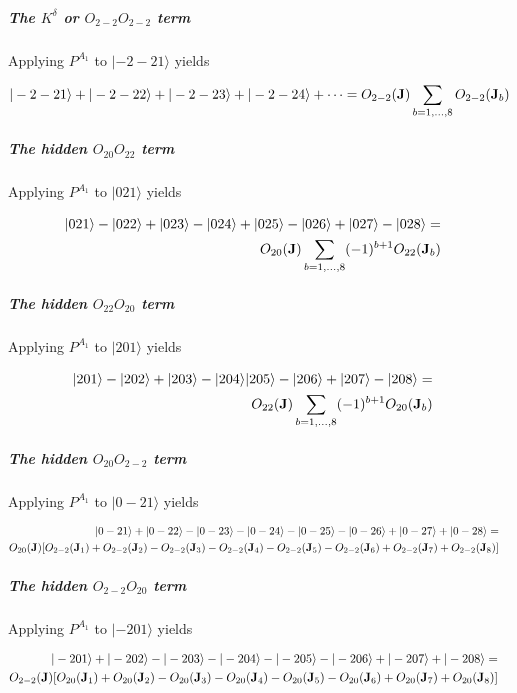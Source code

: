 \subparagraph{The $K^{\delta}$ or $O_{2-2}O_{2-2}$ term}

Applying $P^{A_1}$ to $|-2-21\rangle$ yields 

\begin{equation}
|-2-21\rangle+|-2-22\rangle+|-2-23\rangle+|-2-24\rangle + \dots=
O_{2-2}(\mathbf J)\sum_{b=1,\dots,8}O_{2-2}(\mathbf J_b)
\end{equation}



 \subparagraph{The hidden $O_{20}O_{22}$ term}

Applying $P^{A_1}$ to $|021\rangle$ yields 

\begin{eqnarray}
|021\rangle-|022\rangle+|023\rangle-|024\rangle
+|025\rangle-|026\rangle+|027\rangle-|028\rangle  =&& \\ \nonumber
O_{20}(\mathbf J)\sum_{b=1,...,8} (-1)^{b+1}O_{22}(\mathbf J_b)&&
\end{eqnarray}
   

\subparagraph{The hidden $O_{22}O_{20}$ term}

Applying $P^{A_1}$ to $|201\rangle$ yields 

\begin{eqnarray}
|201\rangle-|202\rangle+|203\rangle-|204\rangle 
|205\rangle-|206\rangle+|207\rangle-|208\rangle 
=&&\\ \nonumber
O_{22}(\mathbf J)\sum_{b=1,...,8} (-1)^{b+1}O_{20}(\mathbf J_b)&&
\end{eqnarray}

 \subparagraph{The hidden $O_{20}O_{2-2}$ term}

Applying $P^{A_1}$ to $|0-21\rangle$ yields 

\begin{eqnarray}
|0-21\rangle+|0-22\rangle-|0-23\rangle-|0-24\rangle
-|0-25\rangle-|0-26\rangle+|0-27\rangle+|0-28\rangle  =&& \\ \nonumber
O_{20}(\mathbf J)[
 O_{2-2}(\mathbf J_1)+O_{2-2}(\mathbf J_2)-O_{2-2}(\mathbf J_3)-O_{2-2}(\mathbf J_4)
-O_{2-2}(\mathbf J_5)-O_{2-2}(\mathbf J_6)+O_{2-2}(\mathbf J_7)+O_{2-2}(\mathbf J_8)
]&&
\end{eqnarray}
 

 \subparagraph{The hidden $O_{2-2}O_{20}$ term}

Applying $P^{A_1}$ to $|-201\rangle$ yields 

\begin{eqnarray}
|-201\rangle+|-202\rangle-|-203\rangle-|-204\rangle
-|-205\rangle-|-206\rangle+|-207\rangle+|-208\rangle  =&& \\ \nonumber
O_{2-2}(\mathbf J)[
 O_{20}(\mathbf J_1)+O_{20}(\mathbf J_2)-O_{20}(\mathbf J_3)-O_{20}(\mathbf J_4)
-O_{20}(\mathbf J_5)-O_{20}(\mathbf J_6)+O_{20}(\mathbf J_7)+O_{20}(\mathbf J_8)
]&&
\end{eqnarray}



